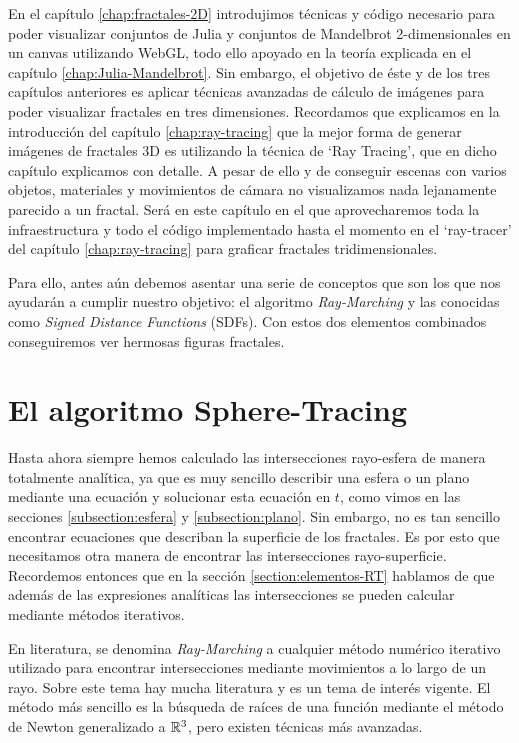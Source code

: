%
%

En el capítulo \ref{chap:fractales-2D} introdujimos técnicas y código necesario para poder visualizar conjuntos de Julia y conjuntos de Mandelbrot 2-dimensionales en un canvas utilizando WebGL, todo ello apoyado en la teoría explicada en el capítulo \ref{chap:Julia-Mandelbrot}. Sin embargo, el objetivo de éste y de los tres capítulos anteriores es aplicar técnicas avanzadas de cálculo de imágenes para poder visualizar fractales en tres dimensiones. Recordamos que explicamos en la introducción del capítulo \ref{chap:ray-tracing} que la mejor forma de generar imágenes de fractales 3D es utilizando la técnica de `Ray Tracing', que en dicho capítulo explicamos con detalle. A pesar de ello y de conseguir escenas con varios objetos, materiales y movimientos de cámara no visualizamos nada lejanamente parecido a un fractal. Será en este capítulo en el que aprovecharemos toda la infraestructura y todo el código implementado hasta el momento en el `ray-tracer' del capítulo \ref{chap:ray-tracing} para graficar fractales tridimensionales.

Para ello, antes aún debemos asentar una serie de conceptos que son los que nos ayudarán a cumplir nuestro objetivo: el algoritmo \textit{Ray-Marching} y las conocidas como \textit{Signed Distance Functions} (SDFs). Con estos dos elementos combinados conseguiremos ver hermosas figuras fractales.

\section{El algoritmo Sphere-Tracing}
\label{section:sphere-tracing}

Hasta ahora siempre hemos calculado las intersecciones rayo-esfera de manera totalmente analítica, ya que es muy sencillo describir una esfera o un plano mediante una ecuación y solucionar esta ecuación en $t$, como vimos en las secciones \ref{subsection:esfera} y \ref{subsection:plano}. Sin embargo, no es tan sencillo encontrar ecuaciones que describan la superficie de los fractales. Es por esto que necesitamos otra manera de encontrar las intersecciones rayo-superficie. Recordemos entonces que en la sección \ref{section:elementos-RT} hablamos de que además de las expresiones analíticas las intersecciones se pueden calcular mediante métodos iterativos. 

En literatura, se denomina \textit{Ray-Marching} a cualquier método numérico iterativo utilizado para encontrar intersecciones mediante movimientos a lo largo de un rayo. Sobre este tema hay mucha literatura y es un tema de interés vigente. El método más sencillo es la búsqueda de raíces de una función mediante el método de Newton generalizado a $\mathbb{R}^3$, pero existen técnicas más avanzadas. 

